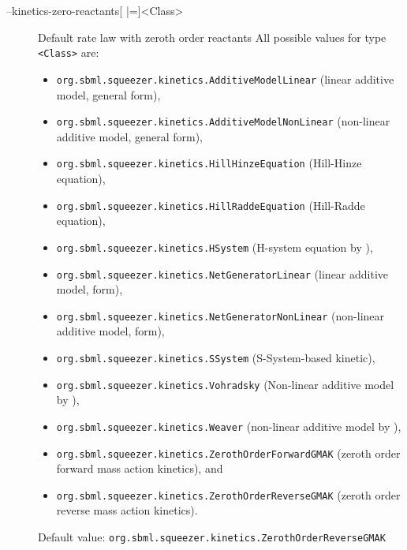 \begin{description}
\item[--kinetics-zero-reactants{[} |={]}<Class>]
  Default rate law with zeroth order reactants
  All possible values for type \texttt{<Class>} are:
  \begin{itemize}
  \item\texttt{org.sbml.squeezer.kinetics.AdditiveModelLinear} (linear additive model, general form),
  \item\texttt{org.sbml.squeezer.kinetics.AdditiveModelNonLinear} (non-linear additive model, general form),
  \item\texttt{org.sbml.squeezer.kinetics.HillHinzeEquation} (Hill-Hinze equation), 
  \item\texttt{org.sbml.squeezer.kinetics.HillRaddeEquation} (Hill-Radde equation),
  \item\texttt{org.sbml.squeezer.kinetics.HSystem} (H-system equation by \citealp{Spieth2006}),
  \item\texttt{org.sbml.squeezer.kinetics.NetGeneratorLinear} (linear additive model, \NetGenerator form),
  \item\texttt{org.sbml.squeezer.kinetics.NetGeneratorNonLinear} (non-linear additive model, \NetGenerator form),
  \item\texttt{org.sbml.squeezer.kinetics.SSystem} (S-System-based kinetic),
  \item\texttt{org.sbml.squeezer.kinetics.Vohradsky} (Non-linear additive model by \citealp*{Vu2007}),
  \item\texttt{org.sbml.squeezer.kinetics.Weaver} (non-linear additive model by \citealp{Weaver1999}),
  \item\texttt{org.sbml.squeezer.kinetics.ZerothOrderForwardGMAK} (zeroth order forward mass action kinetics), and
  \item\texttt{org.sbml.squeezer.kinetics.ZerothOrderReverseGMAK} (zeroth order reverse mass action kinetics).
  \end{itemize}
  Default value: \texttt{org.sbml.squeezer.kinetics.ZerothOrderReverseGMAK}


\end{description}
